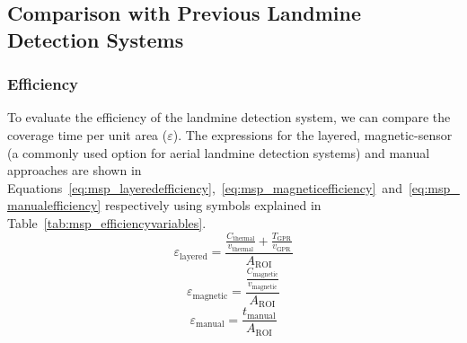 \subsection{Comparison with Previous Landmine Detection Systems}
\label{sec:msp_comparison_manual_demining}

\subsubsection{Efficiency}

To evaluate the efficiency of the landmine detection system, we can compare the coverage time per unit area ($\varepsilon$). The expressions for the layered, magnetic-sensor (a commonly used option for aerial landmine detection systems) and manual approaches are shown in Equations~\ref{eq:msp_layeredefficiency},~\ref{eq:msp_magneticefficiency}~and~\ref{eq:msp_manualefficiency} respectively using symbols explained in Table~\ref{tab:msp_efficiencyvariables}.
\begin{equation}
\label{eq:msp_layeredefficiency}
\varepsilon_{\mathrm{layered}} = \frac{\frac{C_{\mathrm{thermal}}}{v_{\mathrm{thermal}}}+\frac{T_{\mathrm{GPR}}}{v_{\mathrm{GPR}}}}{A_{\mathrm{ROI}}}
\end{equation}
\begin{equation}
\label{eq:msp_magneticefficiency}
\varepsilon_{\mathrm{magnetic}} = \frac{\frac{C_{\mathrm{magnetic}}}{v_{\mathrm{magnetic}}}}{A_{\mathrm{ROI}}}
\end{equation}
\begin{equation}
\label{eq:msp_manualefficiency}
\varepsilon_{\mathrm{manual}} = \frac{t_{\mathrm{manual}}}{A_{\mathrm{ROI}}}
\end{equation}

